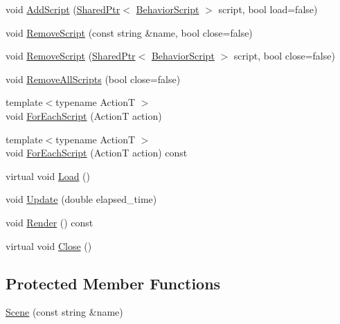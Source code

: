 \begin{DoxyCompactItemize}
\item 
void \hyperlink{classmage_1_1_scene_aa98dbf063994948dd2e434c7f0f6ee06}{Add\+Script} (\hyperlink{namespacemage_a1e01ae66713838a7a67d30e44c67703e}{Shared\+Ptr}$<$ \hyperlink{classmage_1_1_behavior_script}{Behavior\+Script} $>$ script, bool load=false)
\item 
void \hyperlink{classmage_1_1_scene_ad240957fb1b30254878cda8e20d7f7f4}{Remove\+Script} (const string \&name, bool close=false)
\item 
void \hyperlink{classmage_1_1_scene_a90808e9356fae9b156a6e23c03950f77}{Remove\+Script} (\hyperlink{namespacemage_a1e01ae66713838a7a67d30e44c67703e}{Shared\+Ptr}$<$ \hyperlink{classmage_1_1_behavior_script}{Behavior\+Script} $>$ script, bool close=false)
\item 
void \hyperlink{classmage_1_1_scene_a283b7623f1f91e5b7ea53c3c938d6026}{Remove\+All\+Scripts} (bool close=false)
\item 
{\footnotesize template$<$typename ActionT $>$ }\\void \hyperlink{classmage_1_1_scene_a272a7aa84e116c58c24f01731bbcc640}{For\+Each\+Script} (ActionT action)
\item 
{\footnotesize template$<$typename ActionT $>$ }\\void \hyperlink{classmage_1_1_scene_a4d16d973adce12868b9a0df9d92ef6d6}{For\+Each\+Script} (ActionT action) const
\item 
virtual void \hyperlink{classmage_1_1_scene_a472443b059c8be0fcd223f6df8378934}{Load} ()
\item 
void \hyperlink{classmage_1_1_scene_a8751628bf9ed4f15993ca4e8e2ffc966}{Update} (double elapsed\+\_\+time)
\item 
void \hyperlink{classmage_1_1_scene_a98d8af905b60743d40469f71f3acdbf6}{Render} () const
\item 
virtual void \hyperlink{classmage_1_1_scene_afcdedaac5ecab7dcbbb180426054aaa5}{Close} ()
\end{DoxyCompactItemize}
\subsection*{Protected Member Functions}
\begin{DoxyCompactItemize}
\item 
\hyperlink{classmage_1_1_scene_aab61b38547fc53aa9c5b3b559f4d2e26}{Scene} (const string \&name)
\end{DoxyCompactItemize}
